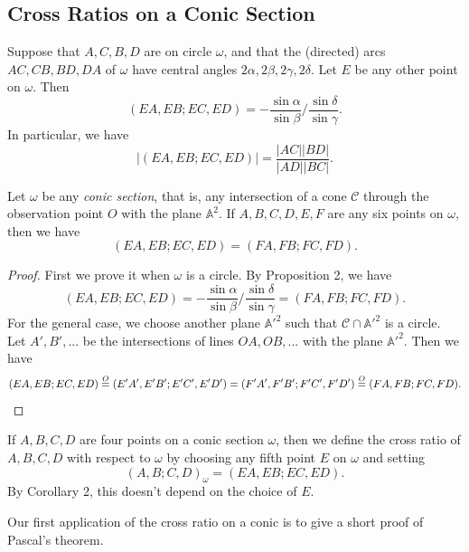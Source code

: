 \subsection{Cross Ratios on a Conic Section}

\begin{prop} Suppose that $A,C,B,D$ are on circle $\omega$, and that the (directed) arcs $AC,CB,BD,DA$ of $\omega$ have central angles $2\alpha,2\beta,2\gamma,2\delta$. Let $E$ be any other point on $\omega$. Then
\[
(EA,EB;EC,ED) = -\frac{\sin \alpha}{\sin \beta}\bigg/\frac{\sin \delta}{\sin \gamma}.
\]
In particular, we have
\[
|(EA,EB;EC,ED)| = \frac{|AC||BD|}{|AD||BC|}.
\]
\end{prop}

\begin{cor} Let $\omega$ be any \emph{conic section}, that is, any intersection of a cone $\mathcal{C}$ through the observation point $O$ with the plane $\mathbb{A}^2$. If $A,B,C,D,E,F$ are any six points on $\omega$, then we have
\[
(EA,EB;EC,ED) = (FA,FB;FC,FD).
\]
\end{cor}
\begin{proof} First we prove it when $\omega$ is a circle. By Proposition 2, we have
\[
(EA,EB;EC,ED) = -\frac{\sin \alpha}{\sin \beta}\bigg/\frac{\sin \delta}{\sin \gamma} = (FA,FB;FC,FD).
\]
For the general case, we choose another plane $\mathbb{A'}^2$ such that $\mathcal{C}\cap\mathbb{A'}^2$ is a circle. Let $A',B',...$ be the intersections of lines $OA,OB, ...$ with the plane $\mathbb{A'}^2$. Then we have
\[
(EA,EB;EC,ED) \stackrel{O}{=} (E'A',E'B';E'C',E'D') = (F'A',F'B';F'C',F'D') \stackrel{O}{=} (FA,FB;FC,FD).\qedhere
\]
\end{proof}

\begin{defn} If $A,B,C,D$ are four points on a conic section $\omega$, then we define the cross ratio of $A,B,C,D$ with respect to $\omega$ by choosing any fifth point $E$ on $\omega$ and setting
\[
(A,B;C,D)_{\omega} = (EA,EB;EC,ED).
\]
By Corollary 2, this doesn't depend on the choice of $E$.
\end{defn}

Our first application of the cross ratio on a conic is to give a short proof of Pascal's theorem.

